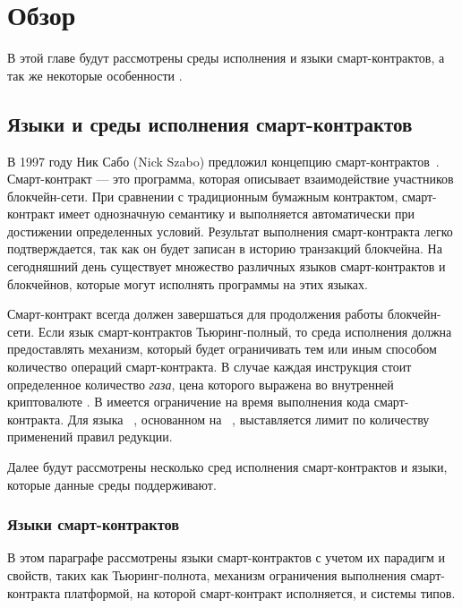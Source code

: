 \section{Обзор}
В этой главе будут рассмотрены среды исполнения и языки смарт-контрактов, а так же некоторые особенности .

\subsection{Языки и среды исполнения смарт-контрактов}
В 1997 году Ник Сабо (Nick Szabo) предложил концепцию смарт-контрактов~\cite{Szabo_SC}.
Смарт-контракт --- это программа, которая описывает взаимодействие участников блокчейн-сети. 
При сравнении с традиционным бумажным контрактом, смарт-контракт имеет однозначную семантику и выполняется автоматически при достижении определенных условий.
Результат выполнения смарт-контракта легко подтверждается, так как он будет записан в историю транзакций блокчейна.
На сегодняшний день существует множество различных языков смарт-контрактов и блокчейнов, которые могут исполнять программы на этих языках.

Смарт-контракт всегда должен завершаться для продолжения работы блокчейн-сети.
Если язык смарт-контрактов Тьюринг-полный, то среда исполнения должна предоставлять механизм, который будет ограничивать тем или иным способом количество операций смарт-контракта.
В случае  каждая инструкция стоит определенное количество \emph{газа}, цена которого выражена во внутренней криптовалюте .
В  имеется ограничение на время выполнения кода смарт-контракта.
Для языка ~\cite{Rholang}, основанном на ~\cite{RhoCalculus}, выставляется лимит по количеству применений правил редукции.

Далее будут рассмотрены несколько сред исполнения смарт-кон\-трак\-тов и языки, которые данные среды поддерживают.

\subsubsection{Языки смарт-контрактов}
В этом параграфе рассмотрены языки смарт-контрактов с учетом их парадигм и свойств, таких как Тьюринг-полнота, механизм ограничения выполнения смарт-контракта платформой, на которой смарт-контракт исполняется, и системы типов.

